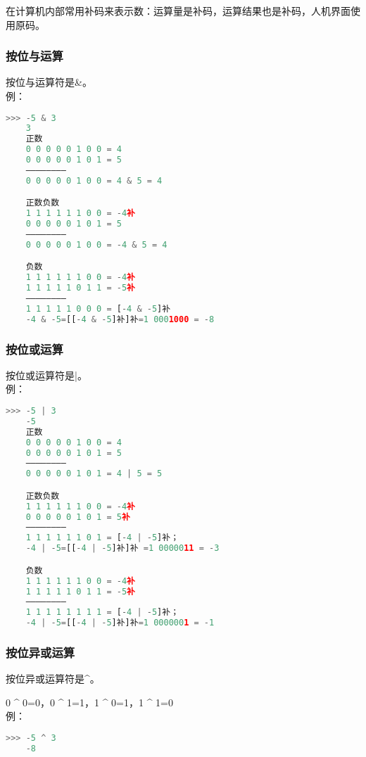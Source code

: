 \documentclass[11pt,a4paper]{article}
\begin{document}
在计算机内部常用补码来表示数：运算量是补码，运算结果也是补码，人机界面使用原码。

\subsubsection{按位与运算}

按位与运算符是\&。\\
例：
\begin{lstlisting}[language={Python}]
    >>> -5 & 3
    3
    正数
    0 0 0 0 0 1 0 0 = 4
    0 0 0 0 0 1 0 1 = 5
    ————————
    0 0 0 0 0 1 0 0 = 4 & 5 = 4

    正数负数
    1 1 1 1 1 1 0 0 = -4补
    0 0 0 0 0 1 0 1 = 5
    ————————
    0 0 0 0 0 1 0 0 = -4 & 5 = 4

    负数
    1 1 1 1 1 1 0 0 = -4补
    1 1 1 1 1 0 1 1 = -5补
    ————————
    1 1 1 1 1 0 0 0 = [-4 & -5]补
    -4 & -5=[[-4 & -5]补]补=1 0001000 = -8
\end{lstlisting}

\subsubsection{按位或运算}

按位或运算符是|。\\
例：
\begin{lstlisting}[language={Python}]
    >>> -5 | 3
    -5
    正数
    0 0 0 0 0 1 0 0 = 4
    0 0 0 0 0 1 0 1 = 5
    ————————
    0 0 0 0 0 1 0 1 = 4 | 5 = 5

    正数负数
    1 1 1 1 1 1 0 0 = -4补
    0 0 0 0 0 1 0 1 = 5补
    ————————
    1 1 1 1 1 1 0 1 = [-4 | -5]补；
    -4 | -5=[[-4 | -5]补]补 =1 0000011 = -3

    负数
    1 1 1 1 1 1 0 0 = -4补
    1 1 1 1 1 0 1 1 = -5补
    ————————
    1 1 1 1 1 1 1 1 = [-4 | -5]补；
    -4 | -5=[[-4 | -5]补]补=1 0000001 = -1
\end{lstlisting}

\subsubsection{按位异或运算}

按位异或运算符是\^{}。

0 \^{} 0=0，0 \^{} 1=1，1 \^{} 0=1，1 \^{} 1=0\\
例：
\begin{lstlisting}[language={Python}]
    >>> -5 ^ 3
    -8
\end{lstlisting}
\end{document}
